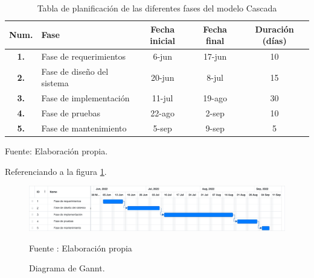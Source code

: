 \begin{table}[H]
    \caption{Tabla de planificación de las diferentes fases del modelo Cascada}
    \label{tabla:ejemplo}
    \begin{center}
        \begin{tabular}{|c|l|c|c|c|}
            \hline
            \textbf{Num.} & \textbf{Fase}  &  \textbf{Fecha inicial} & \textbf{Fecha final} & \textbf{Duración (días)}\\ \hline
            \textbf{1.} & Fase de requerimientos        & 6-jun        & 17-jun        & 10        \\ \hline
            \textbf{2.} & Fase de diseño del sistema       & 20-jun        & 8-jul        & 15        \\ \hline
            \textbf{3.} & Fase de implementación        & 11-jul        & 19-ago        & 30        \\ \hline
            \textbf{4.} & Fase de pruebas        & 22-ago         &   2-sep     &    10     \\ \hline
            \textbf{5.} & Fase de mantenimiento        & 5-sep        & 9-sep        & 5        \\ \hline
        \end{tabular}
        Fuente: Elaboración propia.
    \end{center}
    
\end{table}

Referenciando a la figura \ref{fig:gannt}.
\begin{figure}[H]
    \begin{center}
        \includegraphics[width=17cm]{img/capitulo_4/gant.png}
        \caption{Diagrama de Gannt.}
        Fuente : Elaboración propia
        \label{fig:gannt}
    \end{center}
\end{figure}

